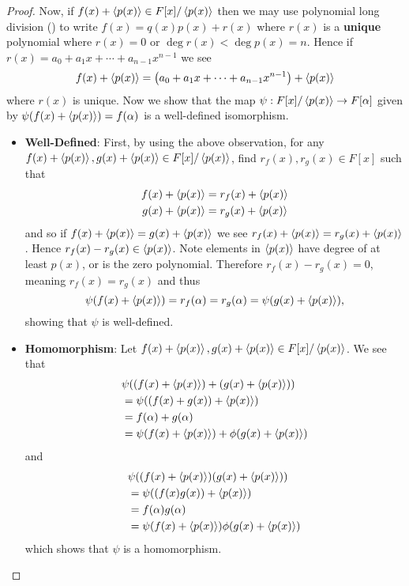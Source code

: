 \begin{proof}
    Now, if $f(x) + \left\langle p(x)\right\rangle \in F[x]/\left\langle p(x)\right\rangle$ then we may use polynomial long division () to write $f(x) = q(x)p(x) + r(x)$ where $r(x)$ is a \textbf{unique} polynomial where $r(x) = 0$ or $\deg r(x) < \deg p(x) = n$. Hence if $r(x) = a_0 + a_1x + \cdots + a_{n-1}x^{n-1}$ we see
    \[
        f(x) + \left\langle p(x)\right\rangle = \left(a_0 + a_1x + \cdots + a_{n-1}x^{n-1}\right) + \left\langle p(x)\right\rangle
    \]
    where $r(x)$ is unique. Now we show that the map $\psi: F[x]/\left\langle p(x)\right\rangle \to F[\alpha]$ given by $\psi(f(x) + \left\langle p(x)\right\rangle) = f(\alpha)$ is a well-defined isomorphism.
    \begin{itemize}
        \item \textbf{Well-Defined}: First, by using the above observation, for any $f(x) + \left\langle p(x)\right\rangle, g(x) + \left\langle p(x)\right\rangle \in F[x]/\left\langle p(x)\right\rangle$, find $r_f(x), r_g(x) \in F[x]$ such that
        \begin{align*}
            f(x) + \left\langle p(x)\right\rangle &= r_f(x) + \left\langle p(x)\right\rangle\\
            g(x) + \left\langle p(x)\right\rangle &= r_g(x) + \left\langle p(x)\right\rangle
        \end{align*}
        and so if $f(x) + \left\langle p(x)\right\rangle = g(x) + \left\langle p(x)\right\rangle$ we see $r_f(x) + \left\langle p(x)\right\rangle = r_g(x) + \left\langle p(x)\right\rangle$. Hence $r_f(x) - r_g(x) \in \left\langle p(x)\right\rangle$. Note elements in $\left\langle p(x)\right\rangle$ have degree of at least $p(x)$, or is the zero polynomial. Therefore $r_f(x) - r_g(x) = 0$, meaning $r_f(x) = r_g(x)$ and thus
        \[
            \psi(f(x) + \left\langle p(x)\right\rangle) = r_f(\alpha) = r_g(\alpha) = \psi(g(x) + \left\langle p(x)\right\rangle),
        \]
        showing that $\psi$ is well-defined.

        \item \textbf{Homomorphism}: Let $f(x) + \left\langle p(x)\right\rangle, g(x) + \left\langle p(x)\right\rangle \in F[x]/\left\langle p(x)\right\rangle$. We see that
        \begin{align*}
            &\psi((f(x) + \left\langle p(x)\right\rangle) + (g(x) + \left\langle p(x)\right\rangle))\\
            &= \psi((f(x) + g(x)) + \left\langle p(x)\right\rangle)\\
            &= f(\alpha) + g(\alpha)\\
            &= \psi(f(x) + \left\langle p(x)\right\rangle) + \phi(g(x) + \left\langle p(x)\right\rangle)
        \end{align*}
        and
        \begin{align*}
            &\psi((f(x) + \left\langle p(x)\right\rangle)(g(x) + \left\langle p(x)\right\rangle))\\
            &= \psi((f(x)g(x)) + \left\langle p(x)\right\rangle)\\
            &= f(\alpha)g(\alpha)\\
            &= \psi(f(x) + \left\langle p(x)\right\rangle)\phi(g(x) + \left\langle p(x)\right\rangle)
        \end{align*}
        which shows that $\psi$ is a homomorphism.


\end{itemize}
\end{proof}
